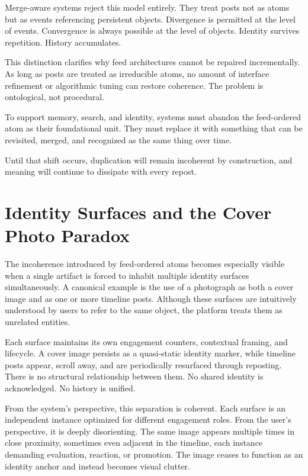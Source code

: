 \documentclass[11pt,oneside]{article}
\begin{document}
Merge-aware systems reject this model entirely. They treat posts not as atoms but as events referencing persistent objects. Divergence is permitted at the level of events. Convergence is always possible at the level of objects. Identity survives repetition. History accumulates.

This distinction clarifies why feed architectures cannot be repaired incrementally. As long as posts are treated as irreducible atoms, no amount of interface refinement or algorithmic tuning can restore coherence. The problem is ontological, not procedural.

To support memory, search, and identity, systems must abandon the feed-ordered atom as their foundational unit. They must replace it with something that can be revisited, merged, and recognized as the same thing over time.

Until that shift occurs, duplication will remain incoherent by construction, and meaning will continue to dissipate with every repost.

\section{Identity Surfaces and the Cover Photo Paradox}

The incoherence introduced by feed-ordered atoms becomes especially visible when a single artifact is forced to inhabit multiple identity surfaces simultaneously. A canonical example is the use of a photograph as both a cover image and as one or more timeline posts. Although these surfaces are intuitively understood by users to refer to the same object, the platform treats them as unrelated entities.

Each surface maintains its own engagement counters, contextual framing, and lifecycle. A cover image persists as a quasi-static identity marker, while timeline posts appear, scroll away, and are periodically resurfaced through reposting. There is no structural relationship between them. No shared identity is acknowledged. No history is unified.

From the system’s perspective, this separation is coherent. Each surface is an independent instance optimized for different engagement roles. From the user’s perspective, it is deeply disorienting. The same image appears multiple times in close proximity, sometimes even adjacent in the timeline, each instance demanding evaluation, reaction, or promotion. The image ceases to function as an identity anchor and instead becomes visual clutter.
\end{document}
